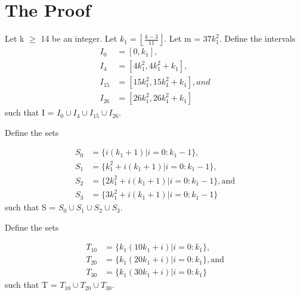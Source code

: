 \section{ The Proof}

Let k $\geq$ 14 be an integer. Let $k_1 = \left \lfloor \frac{k - 3}{11} \right \rfloor$. Let m = $37k_1^2$.  Define the intervals
\begin{align*}
I_0 &= [0, k_1], \\
I_4 &= [4k_1^2, 4k_1^2+k_1], \\
I_{15} &= [15k_1^2, 15k_1^2+k_1], and \\
I_{26} &= [26k_1^2, 26k_1^2+k_1] 
\end{align*}
such that I = $I_0 \cup I_4 \cup I_{15} \cup I_{26}.$

Define the sets

\begin{align*}
S_0 &= \{i(k_1 + 1) | i = 0 : k_1 - 1\},\\
S_1 &= \{k_1^2 + i(k_1 + 1) | i = 0 : k_1 - 1\},\\
S_2 &= \{2k_1^2 + i(k_1 + 1) | i = 0 : k_1 - 1\}, \text{and}\\
S_3 &= \{3k_1^2 + i(k_1 + 1) | i = 0 : k_1 - 1\}
\end{align*}
such that S = $S_0 \cup S_1 \cup S_2 \cup S_3.$

Define the sets

\begin{align*}
T_{10} &= \{k_1(10k_1 + i) | i = 0 : k_1\},\\
T_{20} &= \{k_1(20k_1 + i) | i = 0 : k_1\}, \text{and}\\
T_{30} &= \{k_1(30k_1 + i) | i = 0 : k_1\}
\end{align*}
such that T = $T_{10} \cup T_{20} \cup T_{30} .$

